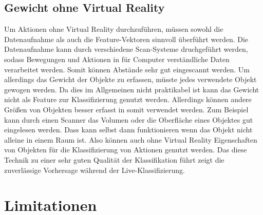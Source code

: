 \subsection{Gewicht ohne Virtual Reality}
\label{subsec:gewicht-ohne-virtual-reality}
Um Aktionen ohne Virtual Reality durchzuführen, müssen sowohl die Datenaufnahme als auch die Feature-Vektoren sinnvoll überführt werden. Die Datenaufnahme kann durch verschiedene Scan-Systeme druchgeführt werden, sodass Bewegungen und Aktionen in für Computer verständliche Daten verarbeitet werden. Somit können Abstände sehr gut eingescannt werden. Um allerdings das Gewicht der Objekte zu erfassen, müsste jedes verwendete Objekt gewogen werden. Da dies im Allgemeinen nicht praktikabel ist kann das Gewicht nicht als Feature zur Klassifizierung genutzt werden. Allerdings können andere Größen von Objekten besser erfasst in somit verwendet werden. Zum Beispiel kann durch einen Scanner das Volumen oder die Oberfläche eines Objektes gut eingelesen werden. Dass kann selbst dann funktionieren wenn das Objekt nicht alleine in einem Raum ist. Also können auch ohne Virtual Reality Eigenschaften von Objekten für die Klassifizierung von Aktionen genutzt werden. Das diese Technik zu einer sehr guten Qualität der Klassifikation führt zeigt die zuverlässige Vorhersage während der Live-Klassifizierung.


\section{Limitationen}
\label{sec:limitation}

